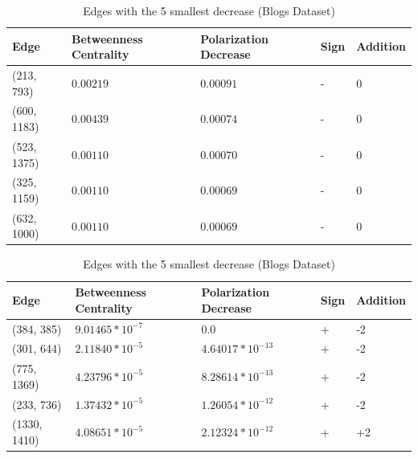\begin{table}[htbp]
 \centering
 \caption{Edges with the 5 largest decrease (Blogs Dataset)}
 \label{tab:edgesLargest}
 \begin{tabular}{| l || l | l | l | l |}
 \hline
  Edge & Betweenness Centrality & Polarization Decrease & Sign & Addition\\
  \hline
  \hline
  (213, 793) & $0.00219$ & $0.00091$ & - &  0\\
  \hline
  (600, 1183) & $0.00439$ & $0.00074$ & - &  0\\
  \hline
  (523, 1375) & $0.00110$ & $0.00070$ & - &  0\\
  \hline
  (325, 1159) & $0.00110$ & $0.00069$ & - &  0\\
  \hline
  (632, 1000) & $0.00110$ & $0.00069$ & - &  0\\
  \hline
 \end{tabular}
 
 
 \caption{Edges with the 5 smallest decrease (Blogs Dataset)}
 \label{tab:edgesLargest}
 \begin{tabular}{| l || l | l | l | l |}
 \hline
  Edge & Betweenness Centrality & Polarization Decrease & Sign & Addition\\
  \hline
  \hline
  (384, 385) & $9.01465*10^{-7}$ & $0.0$ & + &  -2\\
  \hline
  (301, 644) & $2.11840*10^{-5}$ & $4.64017*10^{-13}$ & + &  -2\\
  \hline
  (775, 1369) & $4.23796*10^{-5}$ & $8.28614*10^{-13}$ & + &  -2\\
  \hline
  (233, 736) & $1.37432*10^{-5}$ & $1.26054*10^{-12}$ & + &  -2\\
  \hline
  (1330, 1410) & $4.08651*10^{-5}$ & $2.12324*10^{-12}$ & + &  +2\\
  \hline
  \hline
 \end{tabular}
 
\end{table}



